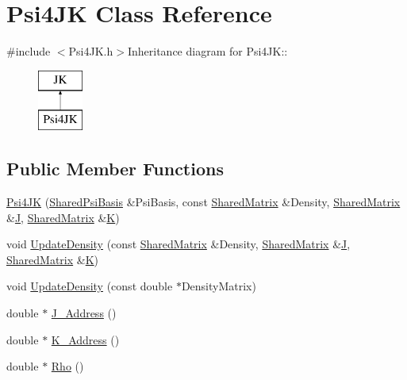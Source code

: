 \hypertarget{classpsi_1_1scf_1_1Psi4JK}{
\section{Psi4JK Class Reference}
\label{classpsi_1_1scf_1_1Psi4JK}
}


{\ttfamily \#include $<$Psi4JK.h$>$}Inheritance diagram for Psi4JK::\begin{figure}[H]
\begin{center}
\leavevmode
\includegraphics[height=2cm]{classpsi_1_1scf_1_1Psi4JK}
\end{center}
\end{figure}
\subsection*{Public Member Functions}
\begin{DoxyCompactItemize}
\item 
\hyperlink{classpsi_1_1scf_1_1Psi4JK_ad4c73ca14721107f570bbf67a1ce18bb}{Psi4JK} (\hyperlink{namespacepsi_a00b3104f9d454b5adfe2d16e5f8d1e14}{SharedPsiBasis} \&PsiBasis, const \hyperlink{namespacepsi_a672173d36fd5e5d06c17ff19c3bacb9d}{SharedMatrix} \&Density, \hyperlink{namespacepsi_a672173d36fd5e5d06c17ff19c3bacb9d}{SharedMatrix} \&\hyperlink{classJKBuilder_1_1JK_aa04a91cc219b5dabfce19d5316f96887}{J}, \hyperlink{namespacepsi_a672173d36fd5e5d06c17ff19c3bacb9d}{SharedMatrix} \&\hyperlink{classJKBuilder_1_1JK_a5160b673d25f0110d98097f8e7364315}{K})
\item 
void \hyperlink{classpsi_1_1scf_1_1Psi4JK_a36bddec95b737f7ee42688b0de2e730b}{UpdateDensity} (const \hyperlink{namespacepsi_a672173d36fd5e5d06c17ff19c3bacb9d}{SharedMatrix} \&Density, \hyperlink{namespacepsi_a672173d36fd5e5d06c17ff19c3bacb9d}{SharedMatrix} \&\hyperlink{classJKBuilder_1_1JK_aa04a91cc219b5dabfce19d5316f96887}{J}, \hyperlink{namespacepsi_a672173d36fd5e5d06c17ff19c3bacb9d}{SharedMatrix} \&\hyperlink{classJKBuilder_1_1JK_a5160b673d25f0110d98097f8e7364315}{K})
\item 
void \hyperlink{classJKBuilder_1_1JK_ac0b62715458b98f8426017fdd8864670}{UpdateDensity} (const double $\ast$DensityMatrix)
\item 
double $\ast$ \hyperlink{classJKBuilder_1_1JK_ada0787d51feb1496d4aa3a786f870f88}{J\_\-Address} ()
\item 
double $\ast$ \hyperlink{classJKBuilder_1_1JK_a198d3c4da107eb0d9cfafa795f8d635b}{K\_\-Address} ()
\item 
double $\ast$ \hyperlink{classJKBuilder_1_1JK_a5104eb472d984f59df6ca3b91c625209}{Rho} ()
\end{DoxyCompactItemize}
